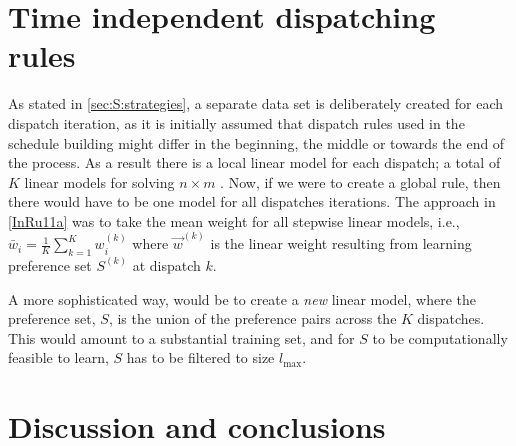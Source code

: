 \section{Time independent dispatching rules}\label{sec:pref:scalability}
As stated in \cref{sec:S:strategies}, a separate data set is deliberately 
created for each dispatch iteration, as it is initially assumed that dispatch 
rules used in the schedule building might differ in the beginning, the middle 
or towards the end of the process. As a result there is a local linear model 
for each dispatch; a total of $K$ linear models for solving $n\times m$ 
\jsp. Now, if we were to create a global rule, then there would have to be one 
model for all dispatches iterations. The approach in \cref{InRu11a} was to take 
the mean weight for all stepwise linear models, i.e., 
$\bar{w}_i=\frac{1}{K}\sum_{k=1}^K w_i^{(k)}$ where $\vec{w}^{(k)}$ is 
the linear weight resulting from learning preference set $S^{(k)}$ at dispatch 
$k$. 

A more sophisticated way, would be to create a \emph{new} linear model, where 
the preference set, $S$, is the union of the preference pairs across the $K$ 
dispatches. This would amount to a substantial training set, and for $S$ to be 
computationally feasible to learn, $S$ has to be filtered to size $l_{\max}$.


\section{Discussion and conclusions}
